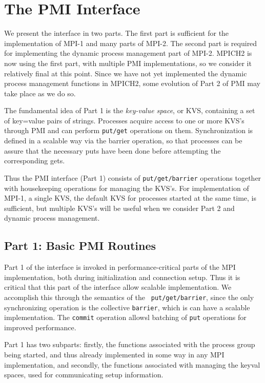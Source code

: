 \documentclass[11pt]{article}
\begin{document}
\section{The PMI Interface}
\label{sec:interface}

We present the interface in two parts.  The first part is sufficient for
the implementation of MPI-1 and many parts of MPI-2.  The second part is
required for implementing the dynamic process management part of MPI-2.
MPICH2 is now using the first part, with multiple PMI implementations,
so we consider it relatively final at this point.  Since we have not yet
implemented the dynamic process management functions in MPICH2, some
evolution of Part 2 of PMI may take place as we do so.

The fundamental idea of Part 1 is the {\em key-value space}, or KVS,
containing a set of key=value pairs of strings.  Processes acquire 
access to one or more KVS's through PMI and can perform {\tt put/get}
operations on them.  Synchronization is defined in a scalable way via
the barrier operation, so that processes can be assure that the necessary
puts have been done before attempting the corresponding gets.

Thus the PMI interface (Part 1) consists of {\tt put/get/barrier} operations
together with housekeeping operations for managing the KVS's.  For
implementation of MPI-1, a single KVS, the default KVS for processes
started at the same time, is sufficient, but multiple KVS's will be
useful when we consider Part 2 and dynamic process management.


\subsection{Part 1:  Basic PMI Routines}
\label{sec:part1}

Part 1 of the interface is invoked in performance-critical parts of the
MPI implementation, both during initialization and connection setup.
Thus it is critical that this part of the interface allow scalable
implementation.  We accomplish this through the semantics of the {\tt
  put/get/barrier}, since the only synchronizing operation is the
collective {\tt barrier}, which is can have a scalable implementation.
The {\tt commit} operation allowsl batching of {\tt put} operations for
improved performance.

Part 1 has two subparts:  firstly, the functions associated with the process group
being started, and thus already implemented in some way in any MPI
implementation, and secondly, the functions associated with managing the
keyval spaces, used for communicating setup information. 
\end{document}
